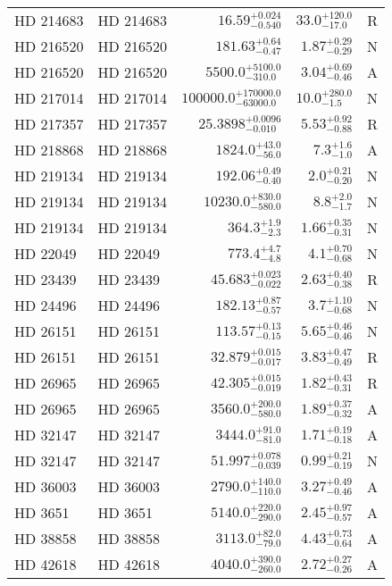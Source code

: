 \begin{longtable*}{llrrr}
HD 214683 & HD 214683 & $16.59^{+0.024}_{-0.540}$ & $33.0^{+120.0}_{-17.0}$ & R \\ 
HD 216520 & HD 216520 & $181.63^{+0.64}_{-0.47}$ & $1.87^{+0.29}_{-0.29}$ & N \\ 
HD 216520 & HD 216520 & $5500.0^{+5100.0}_{-310.0}$ & $3.04^{+0.69}_{-0.46}$ & A \\ 
HD 217014 & HD 217014 & $100000.0^{+170000.0}_{-63000.0}$ & $10.0^{+280.0}_{-1.5}$ & N \\ 
HD 217357 & HD 217357 & $25.3898^{+0.0096}_{-0.010}$ & $5.53^{+0.92}_{-0.88}$ & R \\ 
HD 218868 & HD 218868 & $1824.0^{+43.0}_{-56.0}$ & $7.3^{+1.6}_{-1.0}$ & A \\ 
HD 219134 & HD 219134 & $192.06^{+0.49}_{-0.40}$ & $2.0^{+0.21}_{-0.20}$ & N \\ 
HD 219134 & HD 219134 & $10230.0^{+830.0}_{-580.0}$ & $8.8^{+2.0}_{-1.7}$ & N \\ 
HD 219134 & HD 219134 & $364.3^{+1.9}_{-2.3}$ & $1.66^{+0.35}_{-0.31}$ & N \\ 
HD 22049 & HD 22049 & $773.4^{+4.7}_{-4.8}$ & $4.1^{+0.70}_{-0.68}$ & N \\ 
HD 23439 & HD 23439 & $45.683^{+0.023}_{-0.022}$ & $2.63^{+0.40}_{-0.38}$ & R \\ 
HD 24496 & HD 24496 & $182.13^{+0.87}_{-0.57}$ & $3.7^{+1.10}_{-0.68}$ & N \\ 
HD 26151 & HD 26151 & $113.57^{+0.13}_{-0.15}$ & $5.65^{+0.46}_{-0.46}$ & N \\ 
HD 26151 & HD 26151 & $32.879^{+0.015}_{-0.017}$ & $3.83^{+0.47}_{-0.49}$ & R \\ 
HD 26965 & HD 26965 & $42.305^{+0.015}_{-0.019}$ & $1.82^{+0.43}_{-0.31}$ & R \\ 
HD 26965 & HD 26965 & $3560.0^{+200.0}_{-580.0}$ & $1.89^{+0.37}_{-0.32}$ & A \\ 
HD 32147 & HD 32147 & $3444.0^{+91.0}_{-81.0}$ & $1.71^{+0.19}_{-0.18}$ & A \\ 
HD 32147 & HD 32147 & $51.997^{+0.078}_{-0.039}$ & $0.99^{+0.21}_{-0.19}$ & N \\ 
HD 36003 & HD 36003 & $2790.0^{+140.0}_{-110.0}$ & $3.27^{+0.49}_{-0.46}$ & A \\ 
HD 3651 & HD 3651 & $5140.0^{+220.0}_{-290.0}$ & $2.45^{+0.97}_{-0.57}$ & A \\ 
HD 38858 & HD 38858 & $3113.0^{+82.0}_{-79.0}$ & $4.43^{+0.73}_{-0.64}$ & A \\ 
HD 42618 & HD 42618 & $4040.0^{+390.0}_{-260.0}$ & $2.72^{+0.27}_{-0.26}$ & A \\ 

\end{longtable*}
